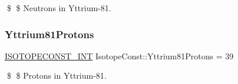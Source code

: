 \$ \$ Neutrons in Yttrium-\/81. \mbox{\label{group___isotope_const-_yttrium-_y81_ga56c57a673c04e38ff92664d2da4c6059}} 
\subsubsection{\texorpdfstring{Yttrium81\+Protons}{Yttrium81Protons}}
{\footnotesize\ttfamily \mbox{\hyperlink{group___isotope_const-_macros_ga5f18360b3e99483a35c32d789e62621c}{I\+S\+O\+T\+O\+P\+E\+C\+O\+N\+S\+T\+\_\+\+I\+NT}} Isotope\+Const\+::\+Yttrium81\+Protons = 39}

\$ \$ Protons in Yttrium-\/81. 
